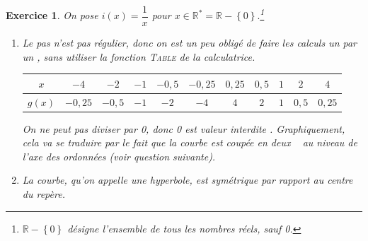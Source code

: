 \documentclass[10pt]{article}
\newtheorem{exo}{Exercice}
\begin{document}
\begin{exo}

On pose $i(x)=\dfrac{1}{x}$ pour $x\in\mathbb{R}^*=\mathbb{R}-\left\{0\right\}.$\footnote{$\mathbb{R}-\left\{0\right\}$ désigne l'ensemble de tous les nombres réels, sauf 0.}

\begin{enumerate}
\item Le pas n'est pas régulier, donc on est un peu obligé de faire les calculs un par un , sans utiliser la fonction \textsc{Table} de la calculatrice.

\begin{center}
\begin{tabular}{|c|c|c|c|c|c|c|c|c|c|c|}
\hline
	$x$&$-4$ &$-2$ &$-1$ &$-0,5$ &$-0,25$& $0,25$ &$0,5$ &$1$ &$2$ &$4$	\\\hline

$g(x)$&$-0,25$&$-0,5$&$-1$&$-2$&$-4$&$4$&$2$&$1$&$0,5$&$0,25$\\\hline
\end{tabular}
\end{center}



\medskip

On ne peut pas diviser par 0, donc 0 est \og valeur interdite \fg. Graphiquement, cela va se traduire par le fait que la courbe est \og coupée en deux \fg~{} au niveau de l'axe des ordonnées (voir question suivante).




\item La courbe, qu'on appelle une hyperbole, est symétrique par rapport au centre du repère.



\medskip




\end{enumerate}
\end{exo}
\end{document}
